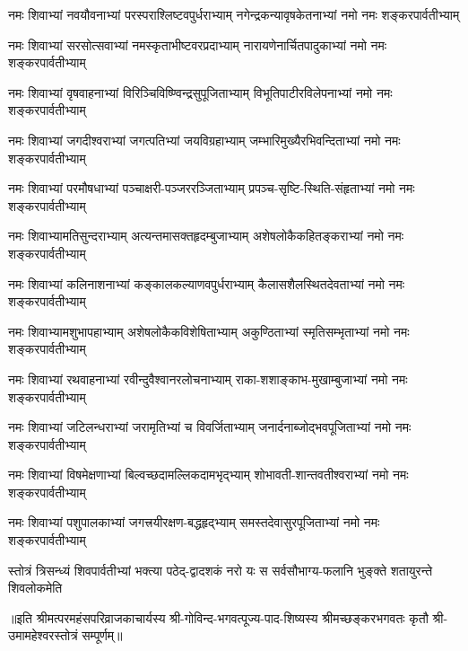 
\begin{AutoCols}[\maxColumns]
\fourlineindentedshloka
{नमः शिवाभ्यां नवयौवनाभ्यां}
{परस्पराश्लिष्टवपुर्धराभ्याम्}
{नगेन्द्रकन्यावृषकेतनाभ्यां}
{नमो नमः शङ्करपार्वतीभ्याम्}%

\fourlineindentedshloka
{नमः शिवाभ्यां सरसोत्सवाभ्यां}
{नमस्कृताभीष्टवरप्रदाभ्याम्}
{नारायणेनार्चितपादुकाभ्यां}
{नमो नमः शङ्करपार्वतीभ्याम्}%

\fourlineindentedshloka
{नमः शिवाभ्यां वृषवाहनाभ्यां}
{विरिञ्चिविष्ण्विन्द्रसुपूजिताभ्याम्}
{विभूतिपाटीरविलेपनाभ्यां}
{नमो नमः शङ्करपार्वतीभ्याम्}%

\fourlineindentedshloka
{नमः शिवाभ्यां जगदीश्वराभ्यां}
{जगत्पतिभ्यां जयविग्रहाभ्याम्}
{जम्भारिमुख्यैरभिवन्दिताभ्यां}
{नमो नमः शङ्करपार्वतीभ्याम्}%

\fourlineindentedshloka
{नमः शिवाभ्यां परमौषधाभ्यां}
{पञ्चाक्षरी-पञ्जररञ्जिताभ्याम्}
{प्रपञ्च-सृष्टि-स्थिति-संहृताभ्यां}
{नमो नमः शङ्करपार्वतीभ्याम्}%

\fourlineindentedshloka
{नमः शिवाभ्यामतिसुन्दराभ्याम्}
{अत्यन्तमासक्तहृदम्बुजाभ्याम्}
{अशेषलोकैकहितङ्कराभ्यां}
{नमो नमः शङ्करपार्वतीभ्याम्}%

\fourlineindentedshloka
{नमः शिवाभ्यां कलिनाशनाभ्यां}
{कङ्कालकल्याणवपुर्धराभ्याम्}
{कैलासशैलस्थितदेवताभ्यां}
{नमो नमः शङ्करपार्वतीभ्याम्}%

\fourlineindentedshloka
{नमः शिवाभ्यामशुभापहाभ्याम्}
{अशेषलोकैकविशेषिताभ्याम्}
{अकुण्ठिताभ्यां स्मृतिसम्भृताभ्यां}
{नमो नमः शङ्करपार्वतीभ्याम्}%

\fourlineindentedshloka
{नमः शिवाभ्यां रथवाहनाभ्यां}
{रवीन्दुवैश्वानरलोचनाभ्याम्}
{राका-शशाङ्काभ-मुखाम्बुजाभ्यां}
{नमो नमः शङ्करपार्वतीभ्याम्}%

\fourlineindentedshloka
{नमः शिवाभ्यां जटिलन्धराभ्यां}
{जरामृतिभ्यां च विवर्जिताभ्याम्}
{जनार्दनाब्जोद्भवपूजिताभ्यां}
{नमो नमः शङ्करपार्वतीभ्याम्}%

\fourlineindentedshloka
{नमः शिवाभ्यां विषमेक्षणाभ्यां}
{बिल्वच्छदामल्लिकदामभृद्भ्याम्}
{शोभावती-शान्तवतीश्वराभ्यां}
{नमो नमः शङ्करपार्वतीभ्याम्}%

\fourlineindentedshloka
{नमः शिवाभ्यां पशुपालकाभ्यां}
{जगत्त्रयीरक्षण-बद्धहृद्भ्याम्}
{समस्तदेवासुरपूजिताभ्यां}
{नमो नमः शङ्करपार्वतीभ्याम्}%

\fourlineindentedshloka
{स्तोत्रं त्रिसन्ध्यं शिवपार्वतीभ्यां}
{भक्त्या पठेद्-द्वादशकं नरो यः}
{स सर्वसौभाग्य-फलानि भुङ्क्ते}
{शतायुरन्ते शिवलोकमेति}%

{॥इति श्रीमत्परमहंसपरिव्राजकाचार्यस्य श्री-गोविन्द-भगवत्पूज्य-पाद-शिष्यस्य
श्रीमच्छङ्करभगवतः कृतौ श्री-उमामहेश्वरस्तोत्रं सम्पूर्णम्॥}

\end{AutoCols}